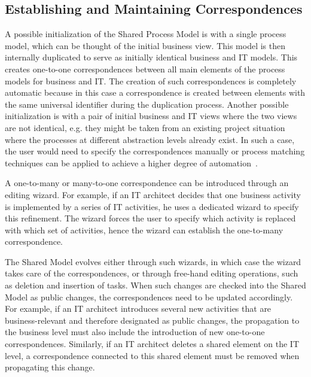 \subsection{Establishing and Maintaining Correspondences}

A possible initialization of the Shared Process Model is with a single process model, which can be thought of the initial business view. This model is then internally duplicated to serve as initially identical business and IT models. This creates one-to-one correspondences between all main elements of the process models for business and IT. The creation of such correspondences is completely automatic because in this case a correspondence is created between elements with the same universal identifier during the duplication process. Another possible initialization is with a pair of initial business and IT views where the two views are not identical, e.g. they might be taken from an existing project situation where the processes at different abstraction levels already exist. In such a case, the user would need to specify the correspondences manually or process matching techniques can be applied to achieve a higher degree of automation~\cite{Branco12}.

A one-to-many or many-to-one correspondence can be introduced through an  editing wizard. For example, if an IT architect decides that one business activity is implemented by a series of IT activities, he uses a dedicated wizard to specify this refinement. The wizard forces the user to specify which activity is replaced with which set of activities, hence the wizard can establish the one-to-many correspondence.

The Shared Model evolves either through such wizards, in which case the wizard takes care of the correspondences, or through free-hand editing operations, such as deletion and insertion of tasks. When such changes are checked into the Shared Model as public changes, the correspondences need to be updated accordingly. For example, if an IT architect introduces several new activities that are business-relevant and therefore designated as public changes, the propagation to the business level must also include the introduction of new one-to-one correspondences. Similarly, if an IT architect deletes a shared element on the IT level, a correspondence connected to this shared element must be removed when propagating this change.


